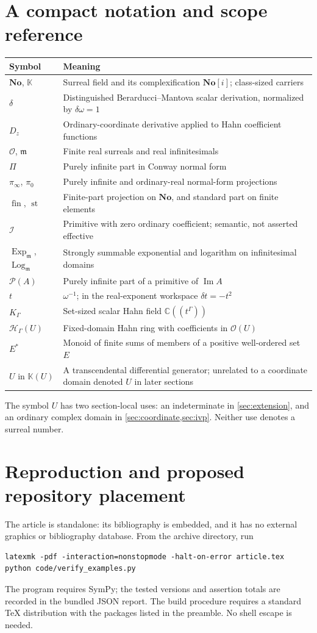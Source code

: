 \documentclass[11pt,letterpaper]{article}
\numberwithin{equation}{section}
\theoremstyle{definition}
\theoremstyle{remark}
\newcommand{\No}{\mathbf{No}}
\newcommand{\K}{\mathbb K}
\newcommand{\C}{\mathbb C}
\newcommand{\OO}{\mathcal O}
\newcommand{\mm}{\mathfrak m}
\newcommand{\HH}{\mathcal H}
\newcommand{\PP}{\Pi}
\newcommand{\st}{\operatorname{st}}
\newcommand{\fin}{\operatorname{fin}}
\newcommand{\im}{\operatorname{Im}}
\newcommand{\Ex}{\operatorname{Exp}_{\mm}}
\newcommand{\Lm}{\operatorname{Log}_{\mm}}
\newcommand{\Iop}{\mathcal I}
\newcommand{\Ob}{\mathcal P}
\begin{document}
\section{A compact notation and scope reference}
\begin{longtable}{L{0.22\textwidth}L{0.68\textwidth}}
\toprule
Symbol & Meaning\\
\midrule\endhead
$\No$, $\K$ & Surreal field and its complexification $\No[i]$; class-sized carriers\\
$\delta$ & Distinguished Berarducci--Mantova scalar derivation, normalized by $\delta\omega=1$\\
$D_z$ & Ordinary-coordinate derivative applied to Hahn coefficient functions\\
$\OO$, $\mm$ & Finite real surreals and real infinitesimals\\
$\PP$ & Purely infinite part in Conway normal form\\
$\pi_\infty$, $\pi_0$ & Purely infinite and ordinary-real normal-form projections\\
$\fin$, $\st$ & Finite-part projection on $\No$, and standard part on finite elements\\
$\Iop$ & Primitive with zero ordinary coefficient; semantic, not asserted effective\\
$\Ex$, $\Lm$ & Strongly summable exponential and logarithm on infinitesimal domains\\
$\Ob(A)$ & Purely infinite part of a primitive of $\im A$\\
$t$ & $\omega^{-1}$; in the real-exponent workspace $\delta t=-t^2$\\
$K_\Gamma$ & Set-sized scalar Hahn field $\C((t^\Gamma))$\\
$\HH_\Gamma(U)$ & Fixed-domain Hahn ring with coefficients in $\OO(U)$\\
$E^*$ & Monoid of finite sums of members of a positive well-ordered set $E$\\
$U$ in $\K(U)$ & A transcendental differential generator; unrelated to a coordinate domain denoted $U$ in later sections\\
\bottomrule
\end{longtable}
The symbol $U$ has two section-local uses: an indeterminate in \cref{sec:extension}, and an ordinary complex domain in \cref{sec:coordinate,sec:ivp}. Neither use denotes a surreal number.

\section{Reproduction and proposed repository placement}
The article is standalone: its bibliography is embedded, and it has no external graphics or bibliography database. From the archive directory, run
\begin{verbatim}
latexmk -pdf -interaction=nonstopmode -halt-on-error article.tex
python code/verify_examples.py
\end{verbatim}
The program requires SymPy; the tested versions and assertion totals are recorded in the bundled JSON report. The build procedure requires a standard TeX distribution with the packages listed in the preamble. No shell escape is needed.
\end{document}
